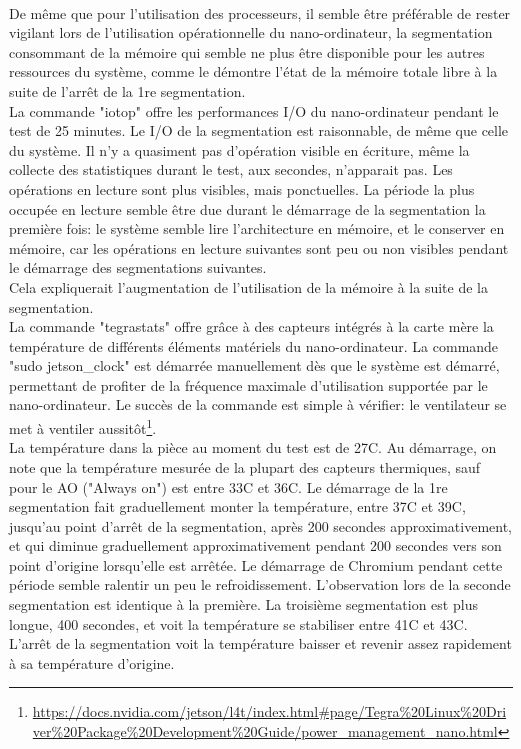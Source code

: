 \vspace{0.5\baselineskip}
\\
\noindent De même que pour l'utilisation des processeurs, il semble être préférable de rester vigilant lors de l'utilisation opérationnelle du nano-ordinateur, la segmentation consommant de la mémoire qui semble ne plus être disponible pour les autres ressources du système, comme le démontre l'état de la mémoire totale libre à la suite de l'arrêt de la 1re segmentation. 
\vspace{0.5\baselineskip}
\\
\noindent La commande "iotop" offre les performances I/O du nano-ordinateur pendant le test de 25 minutes. Le I/O de la segmentation est raisonnable, de même que celle du système. Il n'y a quasiment pas d'opération visible en écriture, même la collecte des statistiques durant le test, aux secondes, n'apparait pas. Les opérations en lecture sont plus visibles, mais ponctuelles. La période la plus occupée en lecture semble être due durant le démarrage de la segmentation la première fois: le système semble lire l'architecture en mémoire, et le conserver en mémoire, car les opérations en lecture suivantes sont peu ou non visibles pendant le démarrage des segmentations suivantes.
\vspace{0.5\baselineskip}
\\
\noindent Cela expliquerait l'augmentation de l'utilisation de la mémoire à la suite de la segmentation. 
\vspace{0.5\baselineskip}
\\
\noindent La commande "tegrastats" offre grâce à des capteurs intégrés à la carte mère la température de différents éléments matériels du nano-ordinateur. La commande "sudo jetson\_clock" est démarrée manuellement dès que le système est démarré, permettant de profiter de la fréquence maximale d'utilisation supportée par le nano-ordinateur. Le succès de la commande est simple à vérifier: le ventilateur se met à ventiler aussitôt\footnote{\url{https://docs.nvidia.com/jetson/l4t/index.html#page/Tegra\%20Linux\%20Driver\%20Package\%20Development\%20Guide/power_management_nano.html}}.
\vspace{0.5\baselineskip}
\\
\noindent La température dans la pièce au moment du test est de 27C. Au démarrage, on note que la température mesurée de la plupart des capteurs thermiques, sauf pour le AO ("Always on") est entre 33C et 36C. Le démarrage de la 1re segmentation fait graduellement monter la température, entre 37C et 39C, jusqu'au point d'arrêt de la segmentation, après 200 secondes approximativement, et qui diminue graduellement approximativement pendant 200 secondes vers son point d'origine lorsqu'elle est arrêtée. Le démarrage de Chromium pendant cette période semble ralentir un peu le refroidissement. L'observation lors de la seconde segmentation est identique à la première. La troisième segmentation est plus longue, 400 secondes, et voit la température se stabiliser entre 41C et 43C. L'arrêt de la segmentation voit la température baisser et revenir assez rapidement à sa température d'origine. 
